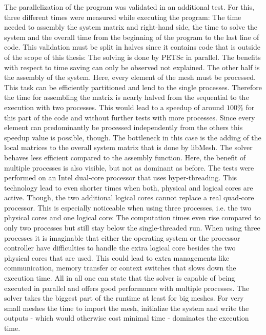   The parallelization of the program was validated in an additional test. For this, three different times were measured while executing the program: The time needed to assembly the system matrix and right-hand side, the time to solve the system and the overall time from the beginning of the program to the last line of code. This validation must be split in halves since it contains code that is outside of the scope of this thesis: The solving is done by PETSc in parallel. The benefits with respect to time saving can only be observed not explained. The other half is the assembly of the system. Here, every element of the mesh must be processed. This task can be efficiently partitioned and lend to the single processes. Therefore the time for assembling the matrix is nearly halved from the sequential to the execution with two processes. This would lead to a speedup of around $100\%$ for this part of the code and without further tests with more processes. Since every element can predominantly be processed independently from the others this speedup value is possible, though. The bottleneck in this case is the adding of the local matrices to the overall system matrix that is done by libMesh. The solver behaves less efficient compared to the assembly function. Here, the benefit of multiple processes is also visible, but not as dominant as before. The tests were performed on an Intel dual-core processor that uses hyper-threading. This technology lead to even shorter times when both, physical and logical cores are active. Though, the two additional logical cores cannot replace a real quad-core processor. This is especially noticeable when using three processes, i.e. the two physical cores and one logical core: The computation times even rise compared to only two processes but still stay below the single-threaded run. When using three processes it is imaginable that either the operating system or the processor controller have difficulties to handle the extra logical core besides the two physical cores that are used. This could lead to extra managements like communication, memory transfer or context switches that slows down the execution time. All in all one can state that the solver is capable of being executed in parallel and offers good performance with multiple processes. The solver takes the biggest part of the runtime at least for big meshes. For very small meshes the time to import the mesh, initialize the system and write the outputs - which would otherwise cost minimal time - dominates the execution time.
  
